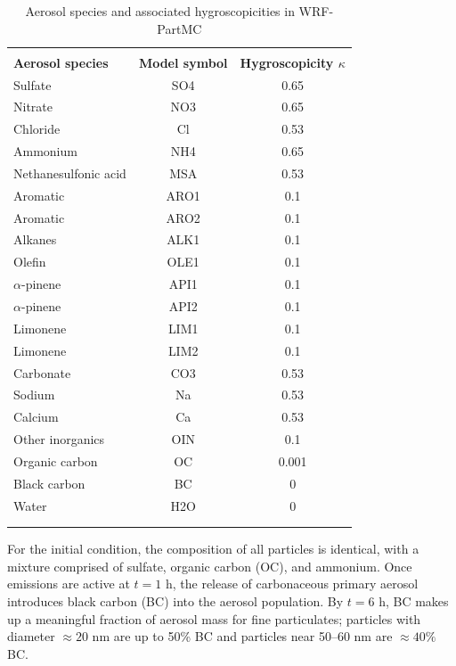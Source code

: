 \begin{table}[!t]
\centering
\caption{Aerosol species and associated hygroscopicities in WRF-PartMC}
\begin{tabular*}{.6\linewidth}{@{\extracolsep{\fill}} lcc}
\\[-2ex]\hline 
     \hline \\[-2ex] \textbf{Aerosol species} & \textbf{Model symbol} & \textbf{Hygroscopicity $\kappa$} \\
\midrule
Sulfate & SO4 & 0.65 \\
Nitrate & NO3 & 0.65 \\
Chloride & Cl & 0.53 \\
Ammonium & NH4 & 0.65 \\
Nethanesulfonic acid & MSA & 0.53 \\
Aromatic & ARO1 & 0.1 \\
Aromatic & ARO2 & 0.1 \\
Alkanes & ALK1 & 0.1 \\
Olefin & OLE1 & 0.1 \\
$\alpha$-pinene & API1 & 0.1 \\
$\alpha$-pinene & API2 & 0.1 \\
Limonene & LIM1 & 0.1 \\
Limonene & LIM2 & 0.1 \\
Carbonate & CO3 & 0.53 \\
Sodium & Na & 0.53 \\
Calcium & Ca & 0.53 \\
Other inorganics & OIN & 0.1 \\
Organic carbon & OC & 0.001 \\
Black carbon & BC & 0 \\
Water & H2O & 0 \\
\\[-2ex]\hline 
     \hline \\[-2ex]
\end{tabular*}
\label{table:wrf-partmc-species}
\end{table}

For the initial condition, the composition of all particles is identical, with a mixture comprised of sulfate, organic carbon (OC), and ammonium. Once emissions are active at $t=1$ h, the release of carbonaceous primary aerosol introduces black carbon (BC) into the aerosol population.  By $t=6$ h, BC makes up a meaningful fraction of aerosol mass for fine particulates; particles with diameter $\approx20$ nm are up to 50\% BC and particles near 50--60 nm are $\approx40\%$ BC.

